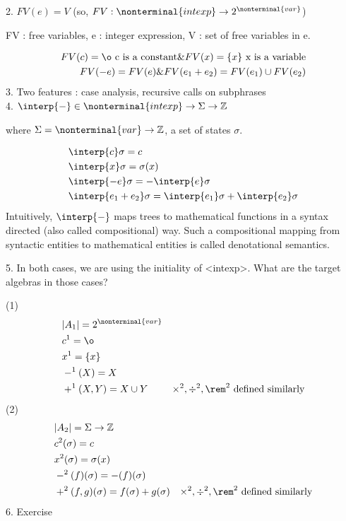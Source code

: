 \documentclass{report}[12pt]
\begin{document}
2. $FV(e) = V$ (so, $FV:\nonterminal{intexp} \rightarrow 2^{\nonterminal{var}}$)

FV : free variables, e : integer expression, V : set of free variables in e.

\begin{align*}
    FV(c) = \o \text{ c is a constant}\char`\& FV(x) = \{x\} \text{ x is a variable}\\
    FV(-e) = FV(e) \char`\& FV(e_1 + e_2) = FV(e_1) \cup FV(e_2)
\end{align*}
3. Two features : case analysis, recursive calls on subphrases\\
4. $\interp{ - } \in \nonterminal{intexp} \rightarrow \Sigma \rightarrow \mathbb{Z}$

where $\Sigma = \nonterminal{var} \rightarrow \mathbb{Z}$, a set of states $\sigma$.

\begin{align*}
    &\interp{ c } \sigma = c \\
    &\interp{ x } \sigma = \sigma(x) \\
    &\interp{ -e } \sigma = - \interp{ e } \sigma \\
    &\interp{ e_1 + e_2 } \sigma = \interp{ e_1 } \sigma + \interp{ e_2 } \sigma
\end{align*}
Intuitively, $\interp{ - }$ maps trees to mathematical functions in a syntax directed (also called compositional) way. Such a compositional mapping from syntactic entities to mathematical entities is called denotational semantics.

5. In both cases, we are using the initiality of <intexp>. What are the target algebras in those cases?

(1) \begin{align*}
    &|A_1| = 2^{\nonterminal{var}} \\
    &c^1 = \o \\
    &x^1 = \{x\}\\
    &-^1 (X) = X \\
    &+^1 (X, Y) = X\cup Y & \times^2, \div^2, \rem^2 \text{ defined similarly}
\end{align*}
(2)
\begin{align*}
    &|A_2| = \Sigma \rightarrow \mathbb{Z} \\
    &c^2 (\sigma) = c\\
    &x^2 (\sigma) = \sigma(x) \\
    &-^2 (f)(\sigma) = -(f)(\sigma) \\
    &+^2 (f, g)(\sigma) = f(\sigma) + g(\sigma) & \times^2, \div^2, \rem^2 \text{ defined similarly}
\end{align*}
6. Exercise
\end{document}
